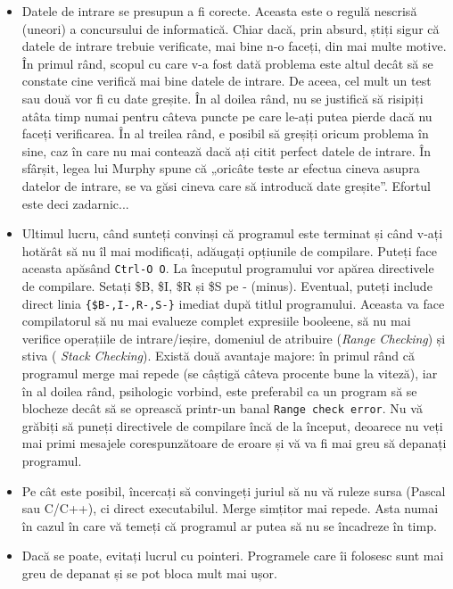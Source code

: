 \begin{itemize}

\item Datele de intrare se presupun a fi corecte. Aceasta este o regulă
  nescrisă (uneori) a concursului de informatică. Chiar dacă, prin absurd,
  știți sigur că datele de intrare trebuie verificate, mai bine n-o faceți,
  din mai multe motive. În primul rând, scopul cu care v-a fost dată problema
  este altul decât să se constate cine verifică mai bine datele de intrare. De
  aceea, cel mult un test sau două vor fi cu date greșite. În al doilea rând,
  nu se justifică să risipiți atâta timp numai pentru câteva puncte pe care
  le-ați putea pierde dacă nu faceți verificarea. În al treilea rând, e
  posibil să greșiți oricum problema în sine, caz în care nu mai contează dacă
  ați citit perfect datele de intrare. În sfârșit, legea lui Murphy spune că
  „oricâte teste ar efectua cineva asupra datelor de intrare, se va găsi
  cineva care să introducă date greșite”. Efortul este deci zadarnic...
  
\item Ultimul lucru, când sunteți convinși că programul este terminat și când
  v-ați hotărât să nu îl mai modificați, adăugați opțiunile de
  compilare. Puteți face aceasta apăsând {\tt Ctrl-O O}. La începutul
  programului vor apărea directivele de compilare. Setați \$B, \$I, \$R și \$S
  pe - (minus). Eventual, puteți include direct linia {\tt \{\$B-,I-,R-,S-\}}
  imediat după titlul programului. Aceasta va face compilatorul să nu mai
  evalueze complet expresiile booleene, să nu mai verifice operațiile de
  intrare/ieșire, domeniul de atribuire ({\it Range Checking}) și stiva ({\it
    Stack Checking}). Există două avantaje majore: în primul rând că programul
  merge mai repede (se câștigă câteva procente bune la viteză), iar în al
  doilea rând, psihologic vorbind, este preferabil ca un program să se
  blocheze decât să se oprească printr-un banal {\tt Range check error}. Nu vă
  grăbiți să puneți directivele de compilare încă de la început, deoarece nu
  veți mai primi mesajele corespunzătoare de eroare și vă va fi mai greu să
  depanați programul.
  
\item Pe cât este posibil, încercați să convingeți juriul să nu vă ruleze
  sursa (Pascal sau C/C++), ci direct executabilul. Merge simțitor mai
  repede. Asta numai în cazul în care vă temeți că programul ar putea să nu se
  încadreze în timp.
  
\item Dacă se poate, evitați lucrul cu pointeri. Programele care îi folosesc
  sunt mai greu de depanat și se pot bloca mult mai ușor.


\end{itemize}
